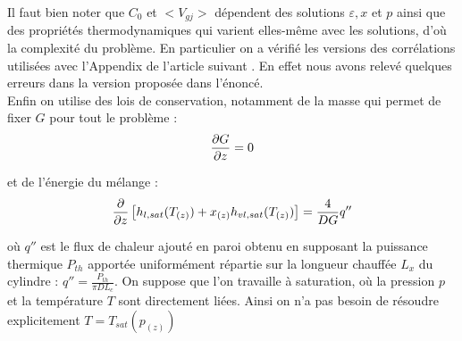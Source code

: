 Il faut bien noter que $C_0$ et $<V_{gj}>$ dépendent des solutions $\varepsilon,x$ et $p$ ainsi que des propriétés thermodynamiques qui varient elles-même avec les solutions, d'où la complexité du problème. En particulier on a vérifié les versions des corrélations utilisées avec l'Appendix de l'article suivant \cite{coddingtonStudyPerformanceVoid2002}. En effet nous avons relevé quelques erreurs dans la version proposée dans l'énoncé.\\ 

Enfin on utilise des lois de conservation, notamment de la masse qui permet de fixer $G$ pour tout le problème :
\begin{equation}
    \pder[G]{z} = 0
\end{equation}

et de l'énergie du mélange :
\begin{equation}
    \pder{z} \left[ h_{l,sat}(T_{(z)})+x_{(z)}h_{vl,sat}(T_{(z)})\right] = \frac{4}{DG}q''
\label{eq:titre}
\end{equation}

où $q''$ est le flux de chaleur ajouté en paroi obtenu en supposant la puissance thermique $P_{th}$ apportée uniformément répartie sur la longueur chauffée $L_x$ du cylindre : $q'' = \frac{P_{th}}{\pi DL_c}$. On suppose que l'on travaille à saturation, où la pression $p$ et la température $T$ sont directement liées. Ainsi on n'a pas besoin de résoudre explicitement $T = T_{sat}(p_{(z)})$\\ \par
